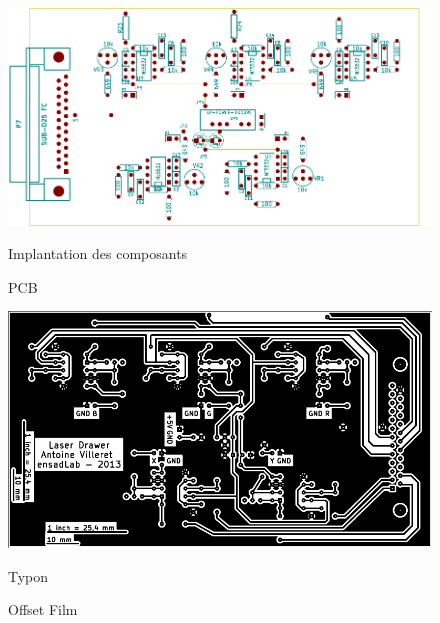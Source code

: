 \begin{appendices}
\begin{figure}[ht]
\begin{bigcenter}
\vskip -80pt
\includegraphics[scale=1,angle=0]{../laser_drawer_schema_v2/pdf/laser_drawer--brd.pdf}
\end{bigcenter}
\begin{fr}
\caption{Implantation des composants}
\label{fig:schema_piste_composant}
\end{fr}
\begin{en}
\caption{PCB}
\label{fig:schema_piste_composant}
\end{en}
\end{figure}

\begin{figure}[ht]
\begin{bigcenter}
\includegraphics[scale=1]{../laser_drawer_schema_v2/pdf/laser_drawer-B_Cu.pdf}
\end{bigcenter}
\begin{fr}
\caption{Typon}
\label{fig:typon}
\end{fr}
\begin{en}
\caption{Offset Film}
\label{fig:typon}
\end{en}
\end{figure}


\end{appendices}
